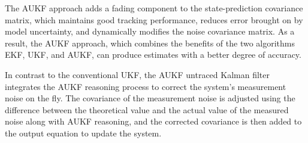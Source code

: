 The AUKF approach adds a fading component to the state-prediction covariance matrix, which maintains good tracking performance, reduces error brought on by model uncertainty, and dynamically modifies the noise covariance matrix. As a result, the AUKF approach, which combines the benefits of the two algorithms EKF, UKF, and AUKF, can produce estimates with a better degree of accuracy.

In contrast to the conventional UKF, the AUKF untraced Kalman filter integrates the AUKF reasoning process to correct the system's measurement noise on the fly. The covariance of the measurement noise is adjusted using the difference between the theoretical value and the actual value of the measured noise along with AUKF reasoning, and the corrected covariance is then added to the output equation to update the system.

